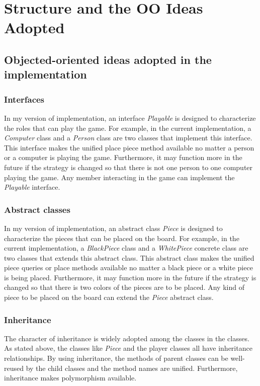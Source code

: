 \documentclass[a4paper]{report}
\begin{document}
\chapter{Structure and  the OO Ideas Adopted}
\section{Objected-oriented ideas adopted in the implementation}
\subsection{Interfaces}
In my version of implementation, an interface \emph{Playable} is designed to characterize the roles that can play the game. For example, in the current implementation, a \emph{Computer} class and a \emph{Person} class are two classes that implement this interface. This interface makes the unified place piece method available no matter a person or a computer is playing the game. Furthermore, it may function more in the future if the strategy is changed so that there is not one person to one computer playing the game. Any member interacting in the game can implement the \emph{Playable} interface.
\subsection{Abstract classes}
In my version of implementation, an abstract class \emph{Piece} is designed to characterize the pieces that can be placed on the board. For example, in the current implementation, a \emph{BlackPiece} class and a \emph{WhitePiece} concrete class are two classes that extends this abstract class. This abstract class makes the unified piece queries or place methods available no matter a black piece or a white piece is being placed. Furthermore, it may function more in the future if the strategy is changed so that there is two colors of the pieces are to be placed. Any kind of piece to be placed on the board can extend the \emph{Piece} abstract class.
\subsection{Inheritance}
The character of inheritance is widely adopted among the classes in the classes. As stated above, the classes like \emph{Piece} and the player classes all have inheritance relationships. By using inheritance, the methods of parent classes can be well-reused by the child classes and the method names are unified. Furthermore, inheritance makes polymorphism available.
\end{document}
